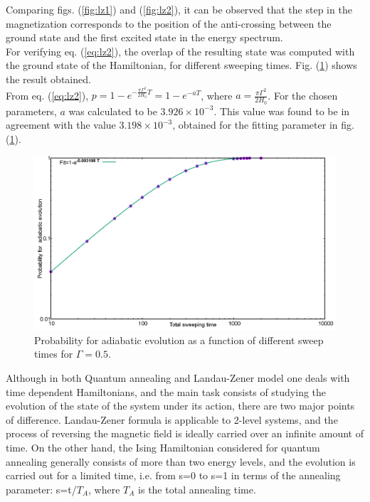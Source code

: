 \documentclass[../main.tex]{subfiles}
\begin{document}
Comparing figs. (\ref{fig:lz1}) and (\ref{fig:lz2}), it can be observed that the step in the magnetization corresponds to the position of the anti-crossing between the ground state and the first excited state in the energy spectrum.\\

For verifying eq. (\ref{eq:lz2}), the overlap of the resulting state was computed with the ground state of the Hamiltonian, for different sweeping times. Fig. (\ref{fig:lz3}) shows the result obtained.\\

From eq. (\ref{eq:lz2}), $p=1-e^{-\frac{\pi \Gamma^2}{2H_0} T}=1-e^{-aT}$, where $a=\frac{\pi \Gamma^2}{2H_0}$. For the chosen parameters, $a$ was calculated to be $3.926 \times 10^{-3}$. This value was found to be in agreement with the value $3.198 \times 10^{-3}$, obtained for the fitting parameter in fig. (\ref{fig:lz3}).

\begin{figure}[H]
\centering 
\includegraphics[scale=0.24]{Prob_1spin_H100.png}
\caption{Probability for adiabatic evolution as a function of different sweep times for $\Gamma=0.5$.}
\label{fig:lz3}
\end{figure}



Although in both Quantum annealing and Landau-Zener model one deals with time dependent Hamiltonians, and the main task consists of studying the evolution of the state of the system under its action, there are two major points of difference. Landau-Zener formula is applicable to 2-level systems, and the process of reversing the magnetic field is ideally carried over an infinite amount of time. On the other hand, the Ising Hamiltonian considered for quantum annealing generally consists of more than two energy levels, and the evolution is carried out for a limited time, i.e. from s=0 to s=1 in terms of the annealing parameter: s=t/$T_A$, where $T_A$ is the total annealing time.
\end{document}
